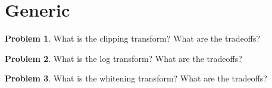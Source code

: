 \documentclass[10pt]{article}
\theoremstyle{definition}
\newtheorem{problem}{Problem}
\begin{document}

\newpage
\section{Generic}
\begin{problem}
    What is the clipping transform?
    What are the tradeoffs?
\end{problem}

\newpage
\begin{problem}
    What is the log transform?
    What are the tradeoffs?
\end{problem}

\newpage
\newpage
\begin{problem}
    What is the whitening transform?
    What are the tradeoffs?
\end{problem}
\end{document}
